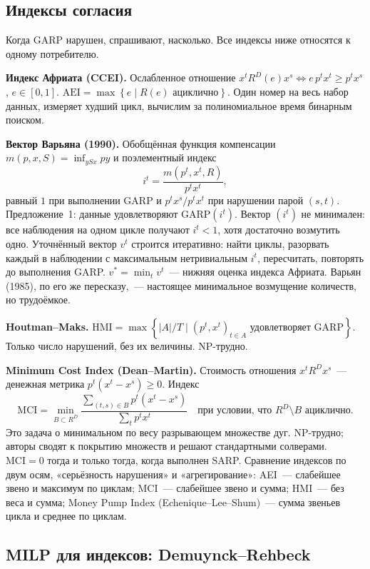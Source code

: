 \documentclass[a4paper,11pt]{article}
\theoremstyle{plain}
\theoremstyle{definition}
\theoremstyle{remark}
\newcommand{\set}[1]{\left\{ #1 \right\}}
\begin{document}
\subsection{Индексы согласия}

Когда GARP нарушен, спрашивают, насколько. Все индексы ниже относятся к одному потребителю.

\textbf{Индекс Африата (CCEI).} Ослабленное отношение $x^tR^D(e)x^s\iff e\,p^tx^t\ge p^tx^s$, $e\in[0,1]$. $\mathrm{AEI}=\max\set{e\mid R(e)\text{ ациклично}}$. Один номер на весь набор данных, измеряет худший цикл, вычислим за полиномиальное время бинарным поиском.

\textbf{Вектор Варьяна (1990).} Обобщённая функция компенсации $m(p,x,S)=\inf_{ySx}py$ и поэлементный индекс
\[
    i^t=\frac{m(p^t,x^t,R)}{p^tx^t},
\]
равный $1$ при выполнении GARP и $p^tx^s/p^tx^t$ при нарушении парой $(s,t)$. Предложение~1: данные удовлетворяют $\mathrm{GARP}(i^t)$. Вектор $(i^t)$ не минимален: все наблюдения на одном цикле получают $i^t<1$, хотя достаточно возмутить одно. Уточнённый вектор $v^t$ строится итеративно: найти циклы, разорвать каждый в наблюдении с максимальным нетривиальным $i^t$, пересчитать, повторять до выполнения GARP. $v^*=\min_tv^t$~--- нижняя оценка индекса Африата. Варьян (1985), по его же пересказу,~--- настоящее минимальное возмущение количеств, но трудоёмкое.

\textbf{Houtman--Maks.} $\mathrm{HMI}=\max\set{|A|/T\mid (p^t,x^t)_{t\in A}\text{ удовлетворяет GARP}}$. Только число нарушений, без их величины. NP-трудно.

\textbf{Minimum Cost Index (Dean--Martin).} Стоимость отношения $x^tR^Dx^s$~--- денежная метрика $p^t(x^t-x^s)\ge0$. Индекс
\[
    \mathrm{MCI}=\min_{B\subset R^D}\frac{\sum_{(t,s)\in B}p^t(x^t-x^s)}{\sum_tp^tx^t}\quad\text{при условии, что }R^D\setminus B\text{ ациклично}.
\]
Это задача о минимальном по весу разрывающем множестве дуг. NP-трудно; авторы сводят к покрытию множеств и решают стандартными солверами. $\mathrm{MCI}=0$ тогда и только тогда, когда выполнен SARP. Сравнение индексов по двум осям, «серьёзность нарушения» и «агрегирование»: AEI~--- слабейшее звено и максимум по циклам; MCI~--- слабейшее звено и сумма; HMI~--- без веса и сумма; Money Pump Index (Echenique--Lee--Shum)~--- сумма звеньев цикла и среднее по циклам.

\subsection{MILP для индексов: Demuynck--Rehbeck}
\end{document}

